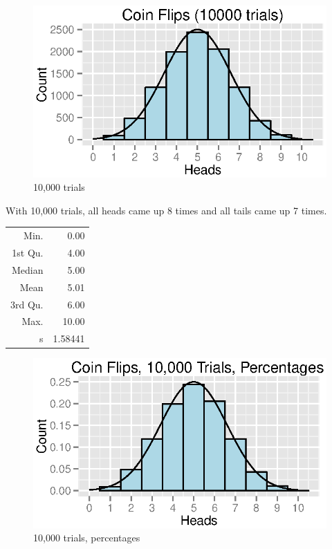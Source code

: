 \documentclass{exam}
\begin{document}
  \begin{figure}[H]
    \centering
    \includegraphics{figures/coins/10000_10.eps}
    \caption{10,000 trials}
  \end{figure}

  With 10,000 trials, all heads came up 8 times and all tails came up 7 times.

  \begin{table}[ht]
    \centering
    \begin{tabular}{rr}
      \toprule
      Min.    & 0.00 \\
      1st Qu. & 4.00 \\
      Median  & 5.00 \\
      Mean    & 5.01 \\
      3rd Qu. & 6.00 \\
      Max.    & 10.00 \\
      s       & 1.58441 \\
      \bottomrule
    \end{tabular}
  \end{table}

  \begin{figure}[H]
    \centering
    \includegraphics{figures/coins/10000_10_percent.eps}
    \caption{10,000 trials, percentages}
  \end{figure}
\end{document}
